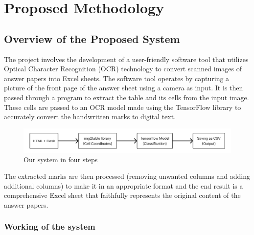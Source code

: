 \chapter{Proposed Methodology}



\section{Overview of the Proposed System}

The project involves the development of a user-friendly software tool that utilizes Optical Character Recognition (OCR) technology to convert scanned images of answer papers into Excel sheets. The software tool operates by capturing a picture of the front page of the answer sheet using a camera as input. It is then passed through a program to extract the table and its cells from the input image. These cells are passed to an OCR model made using the TensorFlow library to accurately convert the handwritten marks to digital text.

\begin{figure}[htbp]
  \centering
  \includegraphics[width=\textwidth]{Images/System_in_four_steps.png}
  \caption{Our system in four steps}
\end{figure}

\noindent The extracted marks are then processed (removing unwanted columns and adding additional columns) to make it in an appropriate format and the end result is a comprehensive Excel sheet that faithfully represents the original content of the answer papers.

\clearpage

\subsection{Working of the system}

